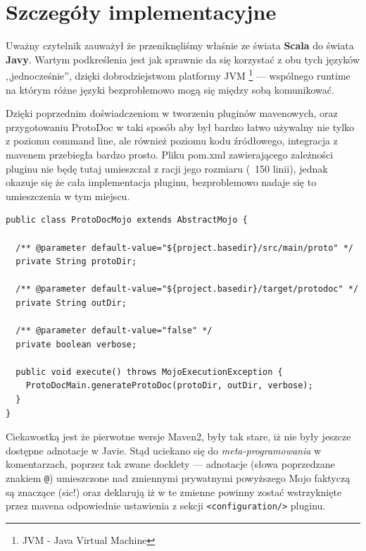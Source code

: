 \documentclass[pdflatex,11pt]{aghdpl}
\begin{document}
\section{Szczegóły implementacyjne}
\label{maven_implementacja}
Uważny czytelnik zauważył że przeniknęliśmy właśnie ze świata \textbf{Scala} do świata \textbf{Javy}.
Wartym podkreślenia jest jak sprawnie da się korzystać z obu tych języków ,,jednocześnie'', 
dzięki dobrodziejstwom platformy JVM \footnote{JVM - Java Virtual Machine} --- wspólnego runtime na którym różne języki bezproblemowo mogą 
się między sobą komunikować.

Dzięki poprzednim doświadczeniom w tworzeniu pluginów mavenowych, oraz przygotowaniu ProtoDoc w taki sposób aby był bardzo łatwo używalny nie tylko z poziomu
command line, ale również poziomu kodu źródłowego, integracja z mavenem przebiegła bardzo prosto. Pliku pom.xml zawierającego zależności pluginu nie będę 
tutaj umieszczał z racji jego rozmiaru (~150 linii), jednak okazuje się że cała implementacja pluginu, bezproblemowo nadaje się to umieszczenia w tym miejscu.

\begin{lstlisting}[caption={Pełna implementacja pluginu mavenowego korzystającego z ProtoDoc}]
public class ProtoDocMojo extends AbstractMojo {

  /** @parameter default-value="${project.basedir}/src/main/proto" */
  private String protoDir;

  /** @parameter default-value="${project.basedir}/target/protodoc" */
  private String outDir;

  /** @parameter default-value="false" */
  private boolean verbose;

  public void execute() throws MojoExecutionException {
    ProtoDocMain.generateProtoDoc(protoDir, outDir, verbose);
  }
}
\end{lstlisting}

Ciekawostką jest że pierwotne wersje Maven2, były tak stare, iż nie były jeszcze dostępne adnotacje w Javie. 
Stąd uciekano się do \textit{meta-programowania} w komentarzach, poprzez tak zwane docklety --- adnotacje (słowa poprzedzane znakiem \verb|@|)
umieszczone nad zmiennymi prywatnymi powyższego Mojo faktyczą są znaczące (sic!) oraz deklarują iż w te zmienne powinny zostać wstrzyknięte
przez mavena odpowiednie ustawienia z sekcji \verb|<configuration/>| pluginu.

\end{document}
